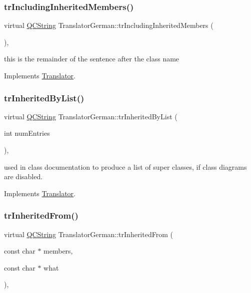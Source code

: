 \subsubsection{\texorpdfstring{trIncludingInheritedMembers()}{trIncludingInheritedMembers()}}
{\footnotesize\ttfamily virtual \mbox{\hyperlink{class_q_c_string}{Q\+C\+String}} Translator\+German\+::tr\+Including\+Inherited\+Members (\begin{DoxyParamCaption}{ }\end{DoxyParamCaption})\hspace{0.3cm}{\ttfamily [inline]}, {\ttfamily [virtual]}}

this is the remainder of the sentence after the class name 

Implements \mbox{\hyperlink{class_translator}{Translator}}.

\mbox{\label{class_translator_german_a0f98ade4c808484da6258121d688b05b}} 
\subsubsection{\texorpdfstring{trInheritedByList()}{trInheritedByList()}}
{\footnotesize\ttfamily virtual \mbox{\hyperlink{class_q_c_string}{Q\+C\+String}} Translator\+German\+::tr\+Inherited\+By\+List (\begin{DoxyParamCaption}\item[{int}]{num\+Entries }\end{DoxyParamCaption})\hspace{0.3cm}{\ttfamily [inline]}, {\ttfamily [virtual]}}

used in class documentation to produce a list of super classes, if class diagrams are disabled. 

Implements \mbox{\hyperlink{class_translator}{Translator}}.

\mbox{\label{class_translator_german_af3678ca0b6cf674a45bd666bbce9d344}} 
\subsubsection{\texorpdfstring{trInheritedFrom()}{trInheritedFrom()}}
{\footnotesize\ttfamily virtual \mbox{\hyperlink{class_q_c_string}{Q\+C\+String}} Translator\+German\+::tr\+Inherited\+From (\begin{DoxyParamCaption}\item[{const char $\ast$}]{members,  }\item[{const char $\ast$}]{what }\end{DoxyParamCaption})\hspace{0.3cm}{\ttfamily [inline]}, {\ttfamily [virtual]}}

